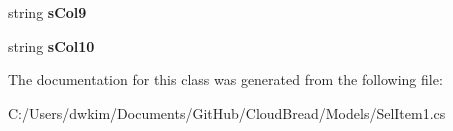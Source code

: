 \begin{DoxyCompactItemize}
\item 
string {\bfseries s\+Col9}\hypertarget{a00091_a9910fa850d912f91c1d738adc433274d}{}\label{a00091_a9910fa850d912f91c1d738adc433274d}

\item 
string {\bfseries s\+Col10}\hypertarget{a00091_a50a356292c280f177dc988f732f0aae4}{}\label{a00091_a50a356292c280f177dc988f732f0aae4}

\end{DoxyCompactItemize}


The documentation for this class was generated from the following file\+:\begin{DoxyCompactItemize}
\item 
C\+:/\+Users/dwkim/\+Documents/\+Git\+Hub/\+Cloud\+Bread/\+Models/Sel\+Item1.\+cs\end{DoxyCompactItemize}
